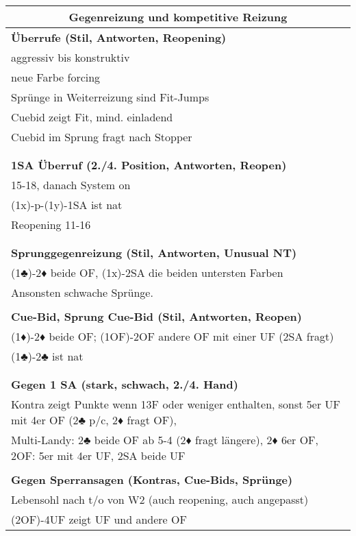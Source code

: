 \documentclass{article}
\begin{document}
\begin{multicols}{3}
\raggedcolumns

\begin{tabularx}{\columnwidth}{|X|}
\hline \multicolumn{1}{|c|}{\bf \large Gegenreizung und kompetitive Reizung} \\
\hline \bf Überrufe (Stil, Antworten, Reopening) \\
\hline aggressiv bis konstruktiv \\
 neue Farbe forcing \\
 Sprünge in Weiterreizung sind Fit-Jumps \\
 Cuebid zeigt Fit, mind. einladend\\
 Cuebid im Sprung fragt nach Stopper \\
\\
\\
\hline \bf 1SA Überruf (2./4. Position, Antworten, Reopen) \\
\hline 15-18, danach System on \\
 (1x)-p-(1y)-1SA ist nat \\
 Reopening 11-16\\
\\
\\
\hline \bf Sprunggegenreizung (Stil, Antworten, Unusual NT) \\
\hline (1♣)-2♦ beide OF, (1x)-2SA die beiden untersten Farben \\
Ansonsten schwache Sprünge.
\\
\\
\hline \bf Cue-Bid, Sprung Cue-Bid (Stil, Antworten, Reopen) \\
\hline (1♦)-2♦ beide OF; (1OF)-2OF andere OF mit einer UF (2SA fragt)\\
(1♣)-2♣ ist nat\\
\\
\\
\hline \bf Gegen 1 SA (stark, schwach, 2./4. Hand) \\
\hline Kontra zeigt Punkte wenn 13F oder weniger enthalten, sonst 5er UF mit 4er OF (2♣ p/c, 2♦ fragt OF), \\
 Multi-Landy: 2♣ beide OF ab 5-4 (2♦ fragt längere), 2♦ 6er OF, 2OF: 5er mit 4er UF, 2SA beide UF \\
\\
\hline \bf Gegen Sperransagen (Kontras, Cue-Bids, Sprünge) \\
\hline Lebensohl nach t/o von W2 (auch reopening, auch angepasst)\\
(2OF)-4UF zeigt UF und andere OF\\

\end{tabularx}
\end{multicols}
\end{document}
